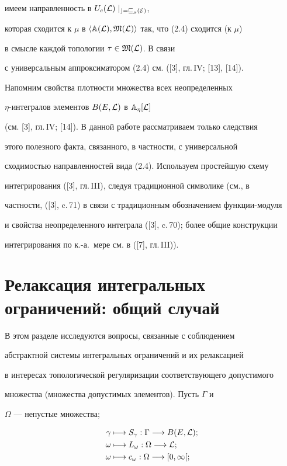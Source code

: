 имеем направленность в $U_c(\cal L)\mid_{c=v_\mu(E)}$,


которая сходится к $\mu$ в $\langle\Bbb A(\cal L),


\frak M(\cal L)\rangle$ так, что (2.4) сходится (к $\mu$)


в смысле каждой топологии $\tau\in\frak M(\cal L)$. В связи


с универсальным аппроксиматором (2.4) см. ([3], гл.\,IV; [13], [14]).


Напомним свойства плотности множества всех неопределенных


$\eta$-интегралов элементов $B(E,\cal L)$ в $\Bbb A_\eta[\cal L]$


(см. [3], гл.\,IV; [14]). В данной работе рассматриваем только следствия


этого полезного факта, связанного, в частности, с универсальной


сходимостью направленностей вида (2.4). Используем простейшую схему


интегрирования ([3], гл.\,III), следуя традиционной символике (см., в


частности, ([3], c.\,71) в связи с традиционным обозначением функции-модуля


и свойства неопределенного интеграла ([3], c.\,70); более общие конструкции


интегрирования по к.-а.~мере см. в ([7], гл.\,III)).





\section{Релаксация интегральных ограничений: общий случай}





В этом разделе исследуются вопросы, связанные с соблюдением


абстрактной системы интегральных ограничений и их релаксацией


в интересах топологической регуляризации соответствующего допустимого


множества (множества допустимых элементов). Пусть $\Gamma$ и


$\Omega$ --- непустые множества;


\begin{align}


\gamma&\longmapsto S_\gamma:\Gamma\longrightarrow B(E,\cal L);\\


\omega&\longmapsto L_\omega:\Omega\longrightarrow\cal L;\\


\omega&\longmapsto c_\omega:\Omega\longrightarrow [0,\infty[;


\end{align}



